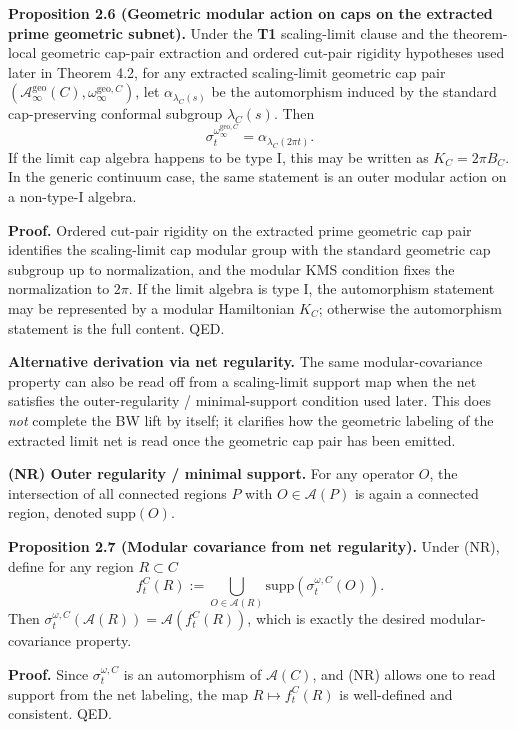 \textbf{Proposition 2.6 (Geometric modular action on caps on the extracted prime geometric subnet).} Under the \textbf{T1} scaling-limit clause and the theorem-local geometric cap-pair extraction and ordered cut-pair rigidity hypotheses used later in Theorem 4.2, for any extracted scaling-limit geometric cap pair \((\mathcal A_\infty^{\mathrm{geo}}(C),\omega_\infty^{\mathrm{geo},C})\), let \(\alpha_{\lambda_C(s)}\) be the automorphism induced by the standard cap-preserving conformal subgroup \(\lambda_C(s)\). Then
\[
\sigma_t^{\omega_\infty^{\mathrm{geo},C}}
=
\alpha_{\lambda_C(2\pi t)}.
\]
If the limit cap algebra happens to be type I, this may be written as \(K_C=2\pi B_C\). In the generic continuum case, the same statement is an outer modular action on a non-type-I algebra.

\textbf{Proof.} Ordered cut-pair rigidity on the extracted prime geometric cap pair identifies the scaling-limit cap modular group with the standard geometric cap subgroup up to normalization, and the modular KMS condition fixes the normalization to \(2\pi\). If the limit algebra is type I, the automorphism statement may be represented by a modular Hamiltonian \(K_C\); otherwise the automorphism statement is the full content. QED.

\textbf{Alternative derivation via net regularity.} The same modular-covariance property can also be read off from a scaling-limit support map when the net satisfies the outer-regularity / minimal-support condition used later. This does \emph{not} complete the BW lift by itself; it clarifies how the geometric labeling of the extracted limit net is read once the geometric cap pair has been emitted.

\textbf{(NR) Outer regularity / minimal support.} For any operator \(O\), the intersection of all connected regions \(P\) with \(O\in\mathcal A(P)\) is again a connected region, denoted \(\mathrm{supp}(O)\).

\textbf{Proposition 2.7 (Modular covariance from net regularity).} Under (NR), define for any region \(R\subset C\)
\[
f_t^C(R)
:=
\bigcup_{O\in \mathcal A(R)}
\mathrm{supp}\!\left(\sigma_t^{\omega,C}(O)\right).
\]
Then \(\sigma_t^{\omega,C}(\mathcal A(R))=\mathcal A(f_t^C(R))\), which is exactly the desired modular-covariance property.

\textbf{Proof.} Since \(\sigma_t^{\omega,C}\) is an automorphism of \(\mathcal A(C)\), and (NR) allows one to read support from the net labeling, the map \(R\mapsto f_t^C(R)\) is well-defined and consistent. QED.

